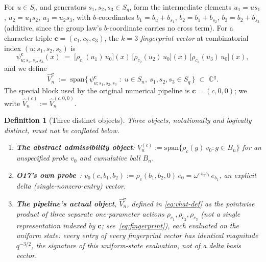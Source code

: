 \documentclass[11pt,a4paper]{article}
\newtheorem{definition}[theorem]{Definition}
\begin{document}
    For $u \in S_n$ and generators $s_1,s_2,s_3 \in S_q$, form the intermediate elements
    $u_1 = u s_1$, $u_2 = u_1 s_2$, $u_3 = u_2 s_3$, with $b$-coordinates
    $b_1 = b_u + b_{s_1}$, $b_2 = b_1 + b_{s_2}$, $b_3 = b_2 + b_{s_3}$
    (additive, since the group law's $b$-coordinate carries no cross term). For a character triple
    $\mathbf{c} = (c_1,c_2,c_3)$, the \emph{$k=3$ fingerprint vector} at combinatorial index
    $(u; s_1,s_2,s_3)$ is
    \begin{equation}
      \label{eq:fingerprint}
      \psi^{\mathbf{c}}_{u;s_1,s_2,s_3}(x)
      \;=\;
      \bigl[\rho_{c_1}(u_1)\, u_0\bigr](x)\,
      \bigl[\rho_{c_2}(u_2)\, u_0\bigr](x)\,
      \bigl[\rho_{c_3}(u_3)\, u_0\bigr](x),
    \end{equation}
    and we define
    \begin{equation}
      \label{eq:vhat-def}
      \widehat V_n^{\mathbf{c}}
      \;:=\;
      \mathrm{span}\bigl\{\, \psi^{\mathbf{c}}_{u;s_1,s_2,s_3} \;:\; u \in S_n,\ s_1,s_2,s_3 \in S_q \,\bigr\}
      \;\subset\; \mathbb{C}^q.
    \end{equation}
    The special block used by the original numerical pipeline is $\mathbf{c} = (c,0,0)$; we write
    $\widehat V_n^{(c)} := \widehat V_n^{(c,0,0)}$.

    \begin{definition}[Three distinct objects]
      \label{def:three-objects}
      Three objects, notationally and logically distinct, must not be conflated below.
      \begin{enumerate}[(1)]
        \item \textbf{The abstract admissibility object}:
          $V_n^{(c)} := \mathrm{span}\{\rho_c(g)\, v_0 : g \in B_n\}$ for an \emph{unspecified}
          probe $v_0$ and cumulative ball $B_n$.
        \item \textbf{O17's own probe}~\cite{Beau2026a21}:
          $v_0(c,b_1,b_2) := \rho_c(b_1,b_2,0)\, e_0 = \omega^{c\, b_2 b_1}\, e_{b_1}$, an explicit
          \emph{delta} (single-nonzero-entry) vector.
        \item \textbf{The pipeline's actual object}, $\widehat V_n^{\mathbf{c}}$, defined in
          \eqref{eq:vhat-def} as the pointwise product of three separate one-parameter actions
          $\rho_{c_1}, \rho_{c_2}, \rho_{c_3}$ (not a single representation indexed by
          $\mathbf c$; see~\eqref{eq:fingerprint}), each evaluated on the \emph{uniform} state:
          every entry of every fingerprint vector has identical magnitude $q^{-3/2}$, the signature
          of this uniform-state evaluation, not of a delta basis vector.
      \end{enumerate}
    \end{definition}
\end{document}
